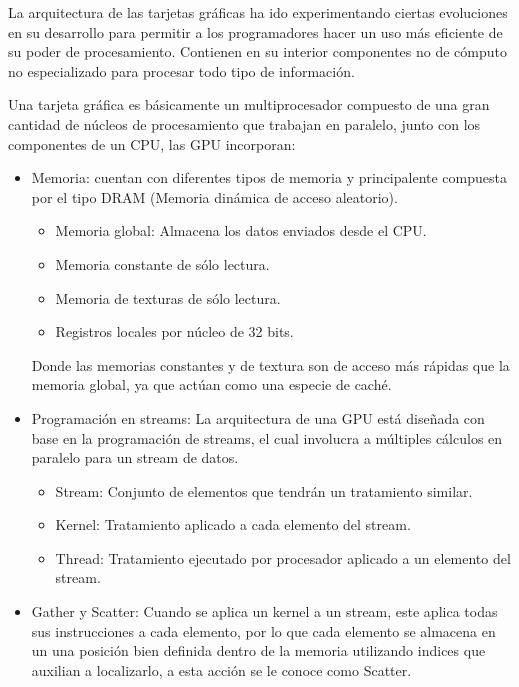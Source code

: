 La arquitectura de las tarjetas gráficas ha ido experimentando ciertas evoluciones en su desarrollo para permitir a los programadores hacer un uso más eficiente de su poder de procesamiento. Contienen en su interior componentes no de cómputo no especializado para procesar todo tipo de información.

Una tarjeta gráfica es básicamente un multiprocesador compuesto de una gran cantidad de núcleos de procesamiento que trabajan en paralelo, junto con los componentes de un CPU, las GPU incorporan:

\begin{itemize}
\item Memoria: cuentan con diferentes tipos de memoria y principalente compuesta por el tipo DRAM (Memoria dinámica de acceso aleatorio).
	\begin{itemize}
	\item Memoria global: Almacena los datos enviados desde el CPU.
	\item Memoria constante de sólo lectura.
	\item Memoria de texturas de sólo lectura.
	\item Registros locales por núcleo de 32 bits. 
	\end{itemize}
Donde las memorias constantes y de textura son de acceso más rápidas que la memoria global, ya que actúan como una especie de caché.

\item Programación en streams: La arquitectura de una GPU está diseñada con base en la programación de streams, el cual involucra a múltiples cálculos en paralelo para un stream de datos\cite{stream}. 

	\begin{itemize}
	\item Stream: Conjunto de elementos que tendrán un tratamiento similar.
	\item Kernel: Tratamiento aplicado a cada elemento del stream.
	\item Thread: Tratamiento ejecutado por procesador aplicado a un elemento del stream.
	\end{itemize} 
	
\item Gather y Scatter: Cuando se aplica un kernel a un stream, este aplica todas sus instrucciones a cada elemento, por lo que cada elemento se almacena en un una posición bien definida dentro de la memoria utilizando indices que auxilian a localizarlo, a esta acción se le conoce como Scatter. 


\end{itemize}
